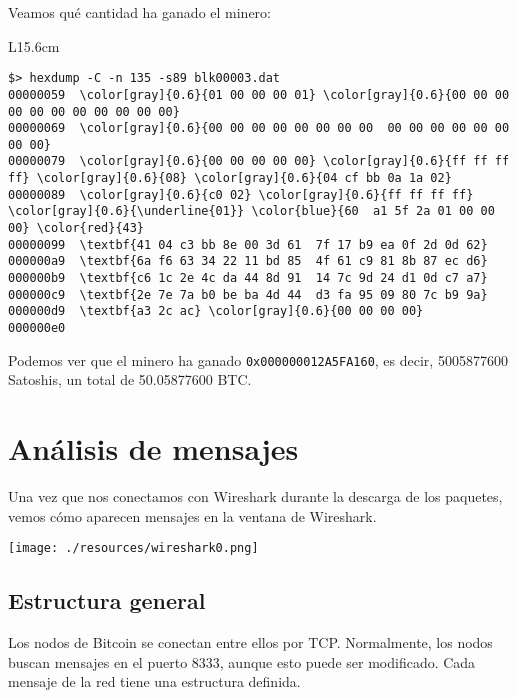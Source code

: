 \documentclass[10pt, a4paper]{article}
\theoremstyle{theorem-style}
\theoremstyle{theorem-style}
\theoremstyle{definition-style}
\theoremstyle{remark-style}
\theoremstyle{example-style}
\theoremstyle{definition-style}
\theoremstyle{remark-style}
\begin{document}
Veamos qué cantidad ha ganado el minero:

\begin{table}[h]
\begin{tabular}{L{15.6cm}}
\begin{minipage}{3in}
\vspace{0.3cm}
\begin{Verbatim}[commandchars=\\\{\}]
$> hexdump -C -n 135 -s89 blk00003.dat
00000059  \color[gray]{0.6}{01 00 00 00 01} \color[gray]{0.6}{00 00 00  00 00 00 00 00 00 00 00}
00000069  \color[gray]{0.6}{00 00 00 00 00 00 00 00  00 00 00 00 00 00 00 00}
00000079  \color[gray]{0.6}{00 00 00 00 00} \color[gray]{0.6}{ff ff ff  ff} \color[gray]{0.6}{08} \color[gray]{0.6}{04 cf bb 0a 1a 02}
00000089  \color[gray]{0.6}{c0 02} \color[gray]{0.6}{ff ff ff ff} \color[gray]{0.6}{\underline{01}} \color{blue}{60  a1 5f 2a 01 00 00 00} \color{red}{43}
00000099  \textbf{41 04 c3 bb 8e 00 3d 61  7f 17 b9 ea 0f 2d 0d 62}
000000a9  \textbf{6a f6 63 34 22 11 bd 85  4f 61 c9 81 8b 87 ec d6}
000000b9  \textbf{c6 1c 2e 4c da 44 8d 91  14 7c 9d 24 d1 0d c7 a7}
000000c9  \textbf{2e 7e 7a b0 be ba 4d 44  d3 fa 95 09 80 7c b9 9a}
000000d9  \textbf{a3 2c ac} \color[gray]{0.6}{00 00 00 00}
000000e0
\end{Verbatim}
\vspace{0cm}
\end{minipage}
\end{tabular}
\end{table}

Podemos ver que el minero ha ganado \texttt{0x000000012A5FA160}, es decir, 5005877600 Satoshis, un total de 50.05877600 BTC.





\pagebreak
\section{Análisis de mensajes}

Una vez que nos conectamos con Wireshark durante la descarga de los paquetes, vemos cómo aparecen mensajes en la ventana de Wireshark.

\begin{center}
	\texttt{[image: ./resources/wireshark0.png]}
\end{center}

\subsection{Estructura general}
Los nodos de Bitcoin se conectan entre ellos por TCP. Normalmente, los nodos buscan mensajes en el puerto 8333, aunque esto puede ser modificado. Cada mensaje de la red tiene una estructura definida.
\end{document}
